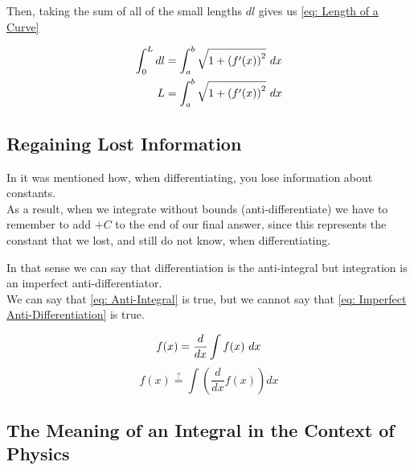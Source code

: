 \documentclass[main.tex]{subfiles}
\begin{document}
                    Then, taking the sum of all of the small lengths $dl$ gives us \eqref{eq: Length of a Curve}

                    \begin{align}
                        \int_0^L d l &= \int_a^b \sqrt{1 + \left(f'(x)\right)^2} \, \, d x \nonumber\\
                        L &= \int_a^b \sqrt{1 + \left(f'(x)\right)^2} \, \, d x
                        \label{eq: Length of a Curve}
                    \end{align}


                
            \newpage


            \subsection{Regaining Lost Information}
                \label{subsec: Regaining Lost Information in Integration}

                In  it was mentioned how, when differentiating, you lose information about constants.\\
                As a result, when we integrate without bounds (anti-differentiate) we have to remember to add $+ C$ to the end of our final answer, since this represents the constant that we lost, and still do not know, when differentiating.

                In that sense we can say that differentiation is the anti-integral but integration is an imperfect anti-differentiator.\\
                We can say that \eqref{eq: Anti-Integral} is true, but we cannot say that \eqref{eq: Imperfect Anti-Differentiation} is true.

                \begin{equation}
                    f(x) = \frac{d}{dx}\int f(x) \, \, d x
                    \label{eq: Anti-Integral}
                \end{equation}
                \begin{equation}
                    f(x) \stackrel{?}{=} \int \left(\frac{d}{dx}f(x)\right)dx
                    \label{eq: Imperfect Anti-Differentiation}
                \end{equation}

                
            \subsection{The Meaning of an Integral in the Context of Physics}
                \label{subsec: Meaning of an Integral}
\end{document}

